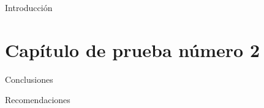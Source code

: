 \documentclass[unAutor, hiperenlaces]{ThesisUTPL}
\begin{document}

%	
\begin{UnnumberedChapter}{Introducción}
	\label{ch:Introduccion}
	
\end{UnnumberedChapter}
%
%
%
\ChapterFormat
%
%

%
\chapter{Capítulo de prueba número 2}
\Blindtext
%
%
\begin{UnnumberedChapter}{Conclusiones}
	
\end{UnnumberedChapter}
%
\begin{UnnumberedChapter}{Recomendaciones}
	
\end{UnnumberedChapter}
%
\paginaBibliografia
%
%
\AppendicesFormat{%
	
	}{
	
}
%
\end{document}
